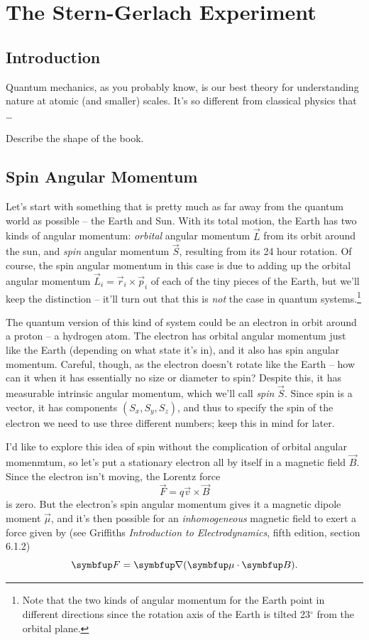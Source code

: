 \chapter{The Stern-Gerlach Experiment}

\section{Introduction}

Quantum mechanics, as you probably know, is our best theory for understanding nature at atomic (and smaller) scales.  It's so different from classical physics that \dots

Describe the shape of the book.


\section{Spin Angular Momentum}

Let's start with something that is pretty much as far away from the quantum world as possible -- the Earth and Sun.  With its total motion, the Earth has two kinds of angular momentum:  \emph{orbital} angular momentum $\vec{L}$ from its orbit around the sun, and \emph{spin} angular momentum $\vec{S}$, resulting from its 24 hour rotation.  Of course, the spin angular momentum in this case is due to adding up the orbital angular momentum $\vec{L}_i = \vec{r}_i \times \vec{p}_i$ of each of the tiny pieces of the Earth, but we'll keep the distinction -- it'll turn out that this is \emph{not} the case in quantum systems.\footnote{Note that the two kinds of angular momentum for the Earth point in different directions since the rotation axis of the Earth is tilted 23$^\circ$ from the orbital plane.}

The quantum version of this kind of system could be an electron in orbit around a proton -- a hydrogen atom.  The electron has orbital angular momentum just like the Earth (depending on what state it's in), and it also has spin angular momentum.  Careful, though, as the electron doesn't rotate like the Earth -- how can it when it has essentially no size or diameter to spin?  Despite this, it has measurable intrinsic angular momentum, which we'll call \emph{spin} $\vec{S}$.  Since spin is a vector, it has components $(S_x, S_y, S_z)$, and thus to specify the spin of the electron we need to use three different numbers; keep this in mind for later.

I'd like to explore this idea of spin without the complication of orbital angular momenmtum, so let's put a stationary electron all by itself in a magnetic field $\vec{B}$.  Since the electron isn't moving, the Lorentz force
\[
\vec{F} = q\vec{v} \times \vec{B}
\]
is zero.  But the electron's spin angular momentum gives it a magnetic dipole moment $\vec{\mu}$, and it's then possible for an \emph{inhomogeneous} magnetic field to exert a force given by (see Griffiths \emph{Introduction to Electrodynamics}, fifth edition, section 6.1.2)
\begin{equation}
\vec{F} = \grad (\vec{\mu} \cdot \vec{B}).
\label{eq_force_inhomo}
\end{equation}

